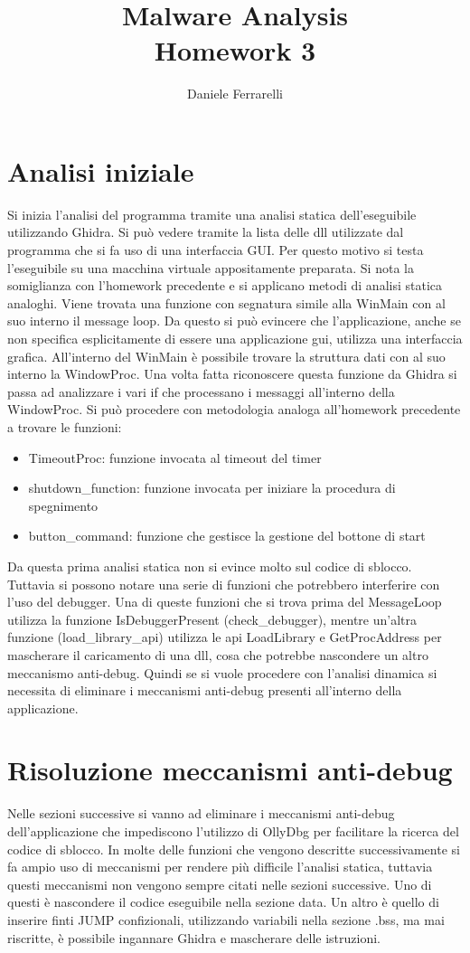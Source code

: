 \documentclass[a4paper,10pt]{article}
\title{Malware Analysis \\ \large Homework 3}
\author{Daniele Ferrarelli}
\date{}
\begin{document}
\maketitle

\section{Analisi iniziale}
Si inizia l'analisi del programma tramite una analisi statica dell'eseguibile utilizzando Ghidra. Si può vedere tramite la lista delle dll utilizzate dal programma che si fa uso di una interfaccia GUI. Per questo motivo si testa l'eseguibile su una macchina virtuale appositamente preparata. Si nota la somiglianza con l'homework precedente e si applicano metodi di analisi statica analoghi. Viene trovata una funzione con segnatura simile alla WinMain con al suo interno il message loop. Da questo si può evincere che l'applicazione, anche se non specifica esplicitamente di essere una applicazione gui, utilizza una interfaccia grafica. All'interno del WinMain è possibile trovare la struttura dati con al suo interno la WindowProc. Una volta fatta riconoscere questa funzione da Ghidra si passa ad analizzare i vari if che processano i messaggi all'interno della WindowProc. Si può procedere con metodologia analoga all'homework precedente a trovare le funzioni:
\begin{itemize}
\item TimeoutProc: funzione invocata al timeout del timer
\item shutdown\_function: funzione invocata per iniziare la procedura di spegnimento
\item button\_command: funzione che gestisce la gestione del bottone di start
\end{itemize}
Da questa prima analisi statica non si evince molto sul codice di sblocco. Tuttavia si possono notare una serie di funzioni che potrebbero interferire con l'uso del debugger. Una di queste funzioni che si trova prima del MessageLoop utilizza la funzione IsDebuggerPresent (check\_debugger), mentre un'altra funzione (load\_library\_api) utilizza le api LoadLibrary e GetProcAddress per mascherare il caricamento di una dll, cosa che potrebbe nascondere un altro meccanismo anti-debug. Quindi se si vuole procedere con l'analisi dinamica si necessita di eliminare i meccanismi anti-debug presenti all'interno della applicazione. 

\section{Risoluzione meccanismi anti-debug}
Nelle sezioni successive si vanno ad eliminare i meccanismi anti-debug dell'applicazione che impediscono l'utilizzo di OllyDbg per facilitare la ricerca del codice di sblocco. In molte delle funzioni che vengono descritte successivamente si fa ampio uso di meccanismi per rendere più difficile l'analisi statica, tuttavia questi meccanismi non vengono sempre citati nelle sezioni successive. Uno di questi è nascondere il codice eseguibile nella sezione data. Un altro è quello di inserire finti JUMP confizionali, utilizzando variabili nella sezione .bss, ma mai riscritte, è possibile ingannare Ghidra e mascherare delle istruzioni.
\end{document}

